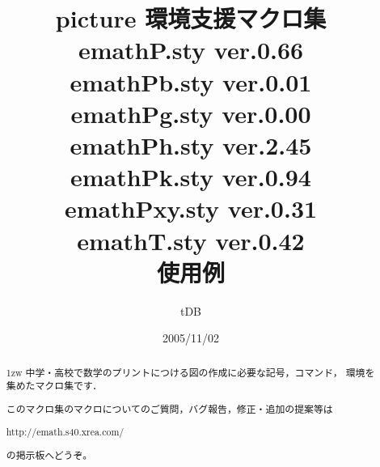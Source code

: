 \documentclass[a4j]{jarticle}
\begin{document}
\title{picture 環境支援マクロ集\\
emathP.sty {\normalsize ver.0.66}\\
emathPb.sty {\normalsize ver.0.01}\\
emathPg.sty {\normalsize ver.0.00}\\
emathPh.sty {\normalsize ver.2.45}\\
emathPk.sty {\normalsize ver.0.94}\\
emathPxy.sty {\normalsize ver.0.31}\\
emathT.sty {\normalsize ver.0.42}\\
使用例}
\author{tDB}
\date{2005/11/02}

\maketitle\thispagestyle{empty}
\begin{abstract}%
\parindent1zw%
中学・高校で数学のプリントにつける図の作成に必要な記号，コマンド，
環境を集めたマクロ集です．

このマクロ集のマクロについてのご質問，バグ報告，修正・追加の提案等は
\begin{center}
http://emath.s40.xrea.com/
\end{center}
の掲示板へどうぞ。
\end{abstract}
\pagebreak
{}%

\tableofcontents

\pagebreak











\end{document}
